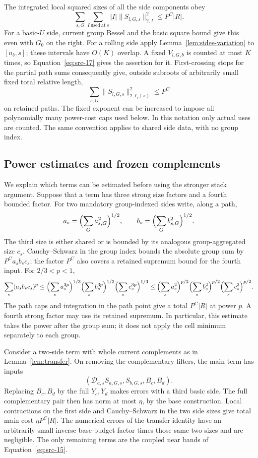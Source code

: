 The integrated local squared sizes of all the side components obey
\[
 \sum_{s,G}\sum_{I\ \mathrm{used\ at}\ s}
       |I|\|S_{l,G,s}\|_{2,I}^2\le P^C|R|.
\]
For a basic-$U$ side, current group Bessel and the basic square bound
give this even with $G_0$ on the right.  For a rolling side apply
Lemma~\ref{lem:sides-variation} to $[u_b,s]$; these intervals have
$O(K)$ overlap.  A fixed $V_{l,G,b}$ is counted at most $K$ times,
so Equation~\eqref{eq:src-17} gives the assertion for it.
First-crossing stops for the partial path sums consequently give,
outside subroots of arbitrarily small fixed total relative length,
\[
 \sum_{s,G}\|S_{l,G,s}\|_{2,I_s(x)}^2\le P^C
\]
on retained paths.  The fixed exponent can be increased to impose
all polynomially many power-cost caps used below.  In this notation
only actual uses are counted.  The same convention applies to shared
side data, with no group index.

\subsection{Power estimates and frozen complements}

We explain which terms can be estimated before using the stronger
stack argument.  Suppose that a term has three strong size factors
and a fourth bounded factor.  For two mandatory group-indexed sides
write, along a path,
\[
 a_s=\Bigl(\sum_Ga_{s,G}^2\Bigr)^{1/2},\qquad
 b_s=\Bigl(\sum_Gb_{s,G}^2\Bigr)^{1/2}.
\]
The third size is either shared or is bounded by its analogous
group-aggregated size $c_s$.  Cauchy--Schwarz in the group index
bounds the absolute group sum by $P^C a_sb_sc_s$; the factor $P^C$
also covers a retained supremum bound for the fourth input.  For
$2/3<p<1$,
\[
 \sum_s(a_sb_sc_s)^p
 \le
 \Bigl(\sum_sa_s^{3p}\Bigr)^{1/3}
 \Bigl(\sum_sb_s^{3p}\Bigr)^{1/3}
 \Bigl(\sum_sc_s^{3p}\Bigr)^{1/3}
 \le
 \Bigl(\sum_sa_s^2\Bigr)^{p/2}
 \Bigl(\sum_sb_s^2\Bigr)^{p/2}
 \Bigl(\sum_sc_s^2\Bigr)^{p/2}.
\]
The path caps and integration in the path point give a total
$P^C|R|$ at power $p$.  A fourth strong factor may use its retained
supremum.  In particular, this estimate takes the power after the
group sum; it does not apply the cell minimum separately to each
group.

Consider a two-side term with whole current complements as in
Lemma~\ref{lem:transfer}.  On removing the complementary filters,
the main term has inputs
\[
 (\mathcal D_{a,s}S_{a,G,s},S_{b,G,s},B_c,B_d).
\]
Replacing $B_c,B_d$ by the full $Y_c,Y_d$ makes errors with a third
basic side.  The full complementary pair then has norm at most
$\eta$, by the base construction.  Local contractions on the first
side and Cauchy--Schwarz in the two side sizes give total main cost
$\eta P^C|R|$.  The numerical errors of the transfer identity have
an arbitrarily small inverse base-budget factor times those same
two sizes and are negligible.  The only remaining terms are the
coupled near bands of Equation~\eqref{eq:src-15}.

